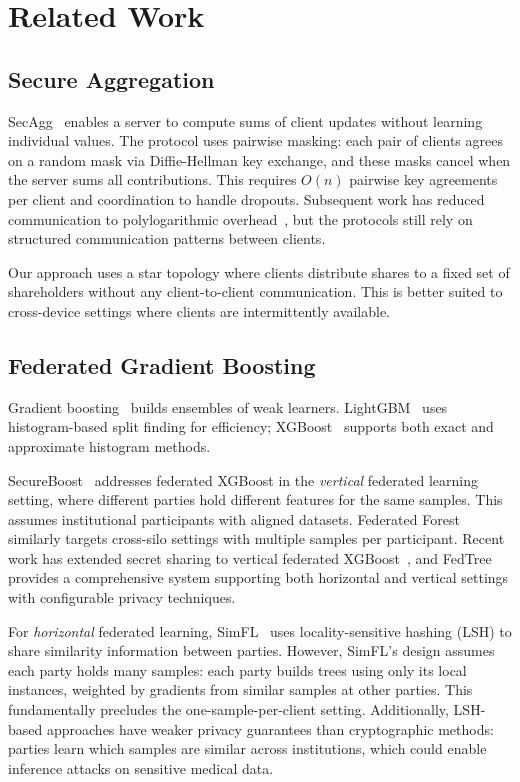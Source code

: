 \documentclass[journal,10pt]{IEEEtran}
\begin{document}
\section{Related Work}

\subsection{Secure Aggregation}

SecAgg~\cite{bonawitz2017} enables a server to compute sums of client updates without learning individual values. The protocol uses pairwise masking: each pair of clients agrees on a random mask via Diffie-Hellman key exchange, and these masks cancel when the server sums all contributions. This requires $O(n)$ pairwise key agreements per client and coordination to handle dropouts. Subsequent work has reduced communication to polylogarithmic overhead~\cite{bell2020}, but the protocols still rely on structured communication patterns between clients.

Our approach uses a star topology where clients distribute shares to a fixed set of shareholders without any client-to-client communication. This is better suited to cross-device settings where clients are intermittently available.

\subsection{Federated Gradient Boosting}

Gradient boosting~\cite{friedman2001} builds ensembles of weak learners. LightGBM~\cite{ke2017} uses histogram-based split finding for efficiency; XGBoost~\cite{chen2016} supports both exact and approximate histogram methods.

SecureBoost~\cite{cheng2021} addresses federated XGBoost in the \textit{vertical} federated learning setting, where different parties hold different features for the same samples. This assumes institutional participants with aligned datasets. Federated Forest~\cite{liu2020fedforest} similarly targets cross-silo settings with multiple samples per participant. Recent work has extended secret sharing to vertical federated XGBoost~\cite{xie2022fedxgb}, and FedTree~\cite{li2023fedtree} provides a comprehensive system supporting both horizontal and vertical settings with configurable privacy techniques.

For \textit{horizontal} federated learning, SimFL~\cite{li2020simfl} uses locality-sensitive hashing (LSH) to share similarity information between parties. However, SimFL's design assumes each party holds many samples: each party builds trees using only its local instances, weighted by gradients from similar samples at other parties. This fundamentally precludes the one-sample-per-client setting. Additionally, LSH-based approaches have weaker privacy guarantees than cryptographic methods: parties learn which samples are similar across institutions, which could enable inference attacks on sensitive medical data.
\end{document}
